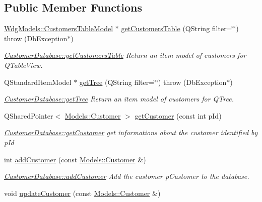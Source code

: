 \subsection*{Public Member Functions}
\begin{DoxyCompactItemize}
\item 
\hyperlink{classGui_1_1Widgets_1_1WdgModels_1_1CustomersTableModel}{Wdg\-Models\-::\-Customers\-Table\-Model} $\ast$ \hyperlink{classDatabases_1_1CustomerDatabase_a9c7ab43d4e219710604e030eb8ab44d8}{get\-Customers\-Table} (Q\-String filter=\char`\"{}\char`\"{})  throw (\-Db\-Exception$\ast$)
\begin{DoxyCompactList}\small\item\em \hyperlink{classDatabases_1_1CustomerDatabase_a9c7ab43d4e219710604e030eb8ab44d8}{Customer\-Database\-::get\-Customers\-Table} Return an item model of customers for Q\-Table\-View. \end{DoxyCompactList}\item 
Q\-Standard\-Item\-Model $\ast$ \hyperlink{classDatabases_1_1CustomerDatabase_ac611950b0502fbfe129ee1d1b495def4}{get\-Tree} (Q\-String filter=\char`\"{}\char`\"{})  throw (\-Db\-Exception$\ast$)
\begin{DoxyCompactList}\small\item\em \hyperlink{classDatabases_1_1CustomerDatabase_ac611950b0502fbfe129ee1d1b495def4}{Customer\-Database\-::get\-Tree} Return an item model of customers for Q\-Tree. \end{DoxyCompactList}\item 
Q\-Shared\-Pointer$<$ \hyperlink{classModels_1_1Customer}{Models\-::\-Customer} $>$ \hyperlink{classDatabases_1_1CustomerDatabase_ab0544439382fb6891cd7d27f67cb120c}{get\-Customer} (const int p\-Id)
\begin{DoxyCompactList}\small\item\em \hyperlink{classDatabases_1_1CustomerDatabase_ab0544439382fb6891cd7d27f67cb120c}{Customer\-Database\-::get\-Customer} get informations about the customer identified by {\itshape p\-Id} \end{DoxyCompactList}\item 
int \hyperlink{classDatabases_1_1CustomerDatabase_a0f45861747bcb0eef12f432dfe9be30e}{add\-Customer} (const \hyperlink{classModels_1_1Customer}{Models\-::\-Customer} \&)
\begin{DoxyCompactList}\small\item\em \hyperlink{classDatabases_1_1CustomerDatabase_a0f45861747bcb0eef12f432dfe9be30e}{Customer\-Database\-::add\-Customer} Add the customer {\itshape p\-Customer} to the database. \end{DoxyCompactList}\item 
\hypertarget{classDatabases_1_1CustomerDatabase_a2ef9838798500e7ad4a09a3ed401fc8b}{void \hyperlink{classDatabases_1_1CustomerDatabase_a2ef9838798500e7ad4a09a3ed401fc8b}{update\-Customer} (const \hyperlink{classModels_1_1Customer}{Models\-::\-Customer} \&)}\label{classDatabases_1_1CustomerDatabase_a2ef9838798500e7ad4a09a3ed401fc8b}


\end{DoxyCompactItemize}
